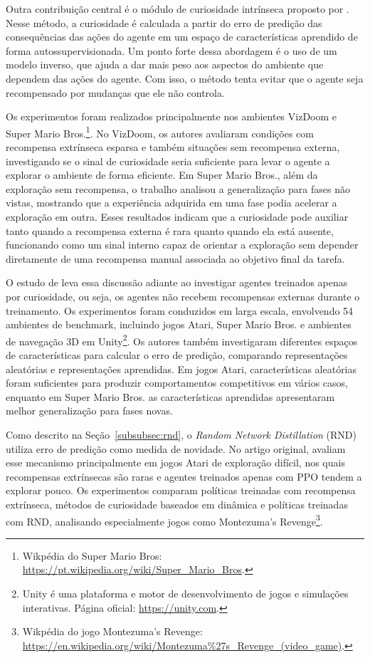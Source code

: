 Outra contribuição central é o módulo de curiosidade intrínseca proposto por . Nesse método, a curiosidade é calculada a partir do erro de predição das consequências das ações do agente em um espaço de características aprendido de forma autossupervisionada. Um ponto forte dessa abordagem é o uso de um modelo inverso, que ajuda a dar mais peso aos aspectos do ambiente que dependem das ações do agente. Com isso, o método tenta evitar que o agente seja recompensado por mudanças que ele não controla.

Os experimentos foram realizados principalmente nos ambientes VizDoom \cite{vizdoom} e Super Mario Bros.\footnote{Wikpédia do Super Mario Bros: \url{https://pt.wikipedia.org/wiki/Super_Mario_Bros}.}. No VizDoom, os autores avaliaram condições com recompensa extrínseca esparsa e também situações sem recompensa externa, investigando se o sinal de curiosidade seria suficiente para levar o agente a explorar o ambiente de forma eficiente. Em Super Mario Bros., além da exploração sem recompensa, o trabalho analisou a generalização para fases não vistas, mostrando que a experiência adquirida em uma fase podia acelerar a exploração em outra. Esses resultados indicam que a curiosidade pode auxiliar tanto quando a recompensa externa é rara quanto quando ela está ausente, funcionando como um sinal interno capaz de orientar a exploração sem depender diretamente de uma recompensa manual associada ao objetivo final da tarefa.

O estudo de  leva essa discussão adiante ao investigar agentes treinados apenas por curiosidade, ou seja, os agentes não recebem recompensas externas durante o treinamento. Os experimentos foram conduzidos em larga escala, envolvendo 54 ambientes de benchmark, incluindo jogos Atari, Super Mario Bros. e ambientes de navegação 3D em Unity\footnote{Unity é uma plataforma e motor de desenvolvimento de jogos e simulações interativas. Página oficial: \url{https://unity.com}.}. Os autores também investigaram diferentes espaços de características para calcular o erro de predição, comparando representações aleatórias e representações aprendidas. Em jogos Atari, características aleatórias foram suficientes para produzir comportamentos competitivos em vários casos, enquanto em Super Mario Bros. as características aprendidas apresentaram melhor generalização para fases novas.

Como descrito na Seção~\ref{subsubsec:rnd}, o \textit{Random Network Distillation} (RND) utiliza erro de predição como medida de novidade. No artigo original,  avaliam esse mecanismo principalmente em jogos Atari de exploração difícil, nos quais recompensas extrínsecas são raras e agentes treinados apenas com PPO tendem a explorar pouco. Os experimentos comparam políticas treinadas com recompensa extrínseca, métodos de curiosidade baseados em dinâmica e políticas treinadas com RND, analisando especialmente jogos como Montezuma's Revenge\footnote{Wikpédia do jogo Montezuma's Revenge: \url{https://en.wikipedia.org/wiki/Montezuma\%27s_Revenge_(video_game)}.}.

